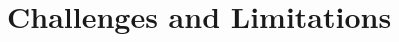 \begin{comment}
		\item \textbf{Power Consumption:} Designed for low-power use, the Portenta H7 may face slower response times during resource-intensive tasks, like continuous face recognition, which could affect performance.
		
		\item \textbf{Latency and Real-Time Performance:} Running models in real-time on the Portenta H7 can lead to delays in face identification, especially in crowded settings or when there are multiple faces to process simultaneously.
		
		\item \textbf{Environmental Constraints:} Changes in ambient lighting, such as direct sunlight or shadows, can significantly impact recognition accuracy. Additionally, how the camera is positioned can limit its ability to effectively detect faces.
		
		\item \textbf{Face Dataset and Profile Limits:} The small dataset, consisting of only 3 distinct faces with 50-70 images each, restricts how well the model can generalize. Managing these face profiles might also require off-device processes due to the hardware constraints.
	\end{itemize}
	
\end{comment}

\section{Challenges and Limitations}

